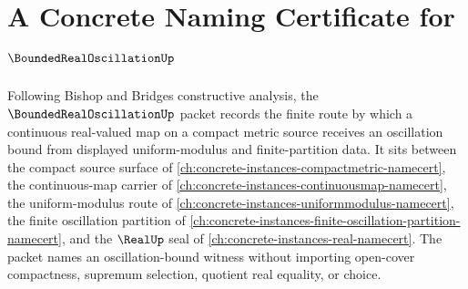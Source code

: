 \chapter{A Concrete Naming Certificate for $\BoundedRealOscillationUp$}
\label{ch:concrete-instances-bounded-real-oscillation-namecert}

Following Bishop and Bridges constructive analysis, the $\BoundedRealOscillationUp$ packet records the finite route by which a continuous real-valued map on a compact metric source receives an oscillation bound from displayed uniform-modulus and finite-partition data. It sits between the compact source surface of \autoref{ch:concrete-instances-compactmetric-namecert}, the continuous-map carrier of \autoref{ch:concrete-instances-continuousmap-namecert}, the uniform-modulus route of \autoref{ch:concrete-instances-uniformmodulus-namecert}, the finite oscillation partition of \autoref{ch:concrete-instances-finite-oscillation-partition-namecert}, and the $\RealUp$ seal of \autoref{ch:concrete-instances-real-namecert}. The packet names an oscillation-bound witness without importing open-cover compactness, supremum selection, quotient real equality, or choice.


